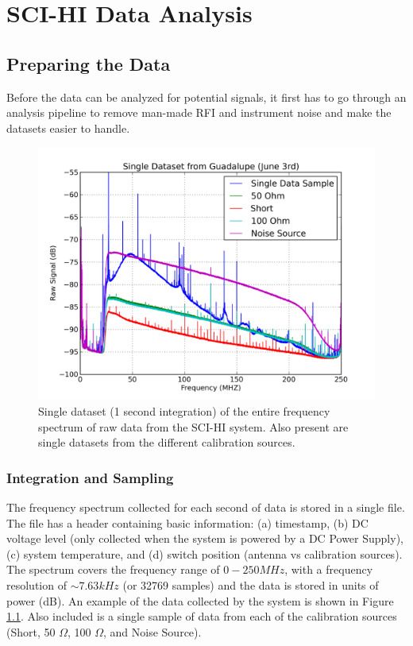 \chapter{SCI-HI Data Analysis}\label{Ch:Data}



\section{Preparing the Data}

Before the data can be analyzed for potential signals, it first has to go through an analysis pipeline to remove man-made RFI and instrument noise and make the datasets easier to handle. 

\begin{figure}[htb]
\begin{center}
\includegraphics[width=0.88\linewidth]{Data_analysis/figures/single_raw_guad_june03.png}
\caption{Single dataset (1 second integration) of the entire frequency spectrum of raw data from the SCI-HI system. Also present are single datasets from the different calibration sources. }
\label{Fig:raw_data}
\end{center}
\end{figure}


\subsection{Integration and Sampling}\label{Sec:int}

The frequency spectrum collected for each second of data is stored in a single file. The file has a header containing basic information: (a) timestamp, (b) DC voltage level (only collected when the system is powered by a DC Power Supply), (c) system temperature, and (d) switch position (antenna vs calibration sources). The spectrum covers the frequency range of $0-250 MHz$, with a frequency resolution of $\sim 7.63 kHz$ (or 32769 samples) and the data is stored in units of power (dB). An example of the data collected by the system is shown in Figure \ref{Fig:raw_data}. Also included is a single sample of data from each of the calibration sources (Short, 50 $\Omega$, 100 $\Omega$, and Noise Source). 

